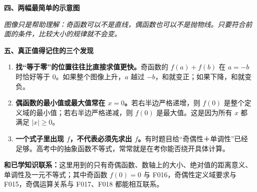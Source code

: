 \clearpage
\begin{explanationbox}
\textbf{\textcolor{CExplanation}{四、两幅最简单的示意图}}




\textit{图像只是帮助理解：奇函数可以不是直线，偶函数也可以不是抛物线。只要符合前面的条件，比较大小的规律就不会变。}

\medskip

\end{explanationbox}
\clearpage
\begin{explanationbox}
\textbf{\textcolor{CExplanation}{五、真正值得记住的三个发现}}


\begin{enumerate}[leftmargin=*,itemsep=0.45em]
  \item \textbf{找“等于零”的位置往往比直接求值更快。}奇函数的 $f(a)+f(b)$ 在 $a=-b$ 时恰好等于 $0$。如果整个图像上升，$a$ 越过 $-b$，和就变正；如果下降，和就变负。
  \item \textbf{偶函数的最小值或最大值常在 $x=0$。}若右半边严格递增，则 $f(0)$ 是整个定义域的最小值；若右半边严格递减，则 $f(0)$ 是最大值。这是因为所有 $x$ 都满足 $|x|\geqslant0$。
  \item \textbf{一个式子里出现 $f$，不代表必须先求出 $f$。}有时题目给“奇偶性＋单调性”已经足够。高考中的抽象函数不等式，常常就是在考你能否绕开具体计算。
\end{enumerate}

\textbf{和已学知识联系：}这里用到的只有奇偶函数、数轴上的大小、绝对值的距离意义、单调性及一元不等式；其中奇函数 $f(0)=0$ 与 F016，奇偶性定义域要求与 F015，奇偶运算关系与 F017、F018 都能相互联系。
\end{explanationbox}
